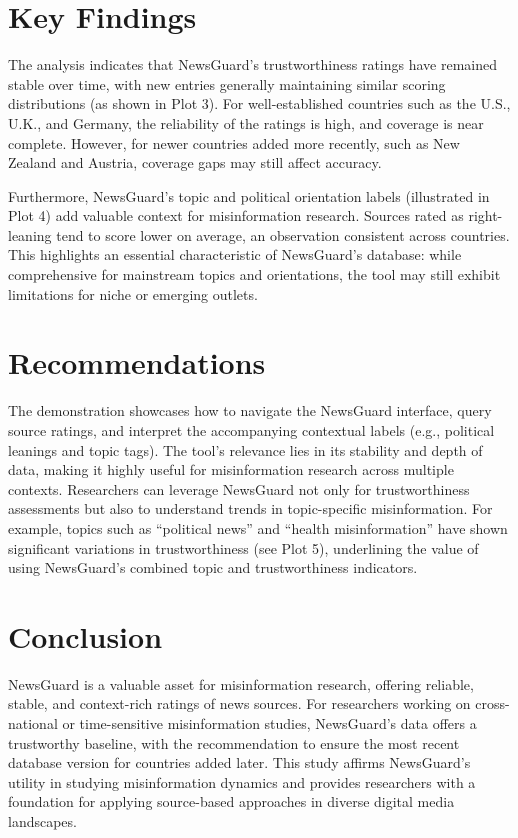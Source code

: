 \documentclass{article}
\begin{document}
\section{Key Findings}
The analysis indicates that NewsGuard’s trustworthiness ratings have remained stable over time, with new entries generally maintaining similar scoring distributions (as shown in Plot 3). 
For well-established countries such as the U.S., U.K., and Germany, the reliability of the ratings is high, and coverage is near complete. 
However, for newer countries added more recently, such as New Zealand and Austria, coverage gaps may still affect accuracy.

Furthermore, NewsGuard’s topic and political orientation labels (illustrated in Plot 4) add valuable context for misinformation research. Sources rated as right-leaning tend to score lower on average, an observation consistent across countries. 
This highlights an essential characteristic of NewsGuard’s database: while comprehensive for mainstream topics and orientations, the tool may still exhibit limitations for niche or emerging outlets.

\section{Recommendations}
The demonstration showcases how to navigate the NewsGuard interface, query source ratings, and interpret the accompanying contextual labels (e.g., political leanings and topic tags). 
The tool’s relevance lies in its stability and depth of data, making it highly useful for misinformation research across multiple contexts. 
Researchers can leverage NewsGuard not only for trustworthiness assessments but also to understand trends in topic-specific misinformation. 
For example, topics such as “political news” and “health misinformation” have shown significant variations in trustworthiness (see Plot 5), underlining the value of using NewsGuard’s combined topic and trustworthiness indicators.

\section{Conclusion}
NewsGuard is a valuable asset for misinformation research, offering reliable, stable, and context-rich ratings of news sources. 
For researchers working on cross-national or time-sensitive misinformation studies, NewsGuard's data offers a trustworthy baseline, with the recommendation to ensure the most recent database version for countries added later. 
This study affirms NewsGuard’s utility in studying misinformation dynamics and provides researchers with a foundation for applying source-based approaches in diverse digital media landscapes.
\end{document}
